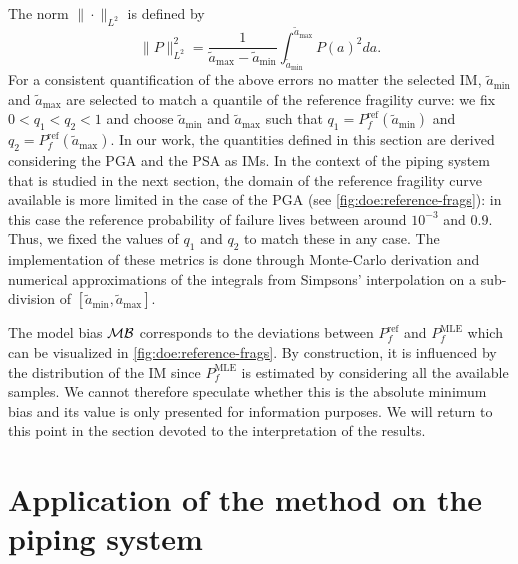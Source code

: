 The norm $\|\cdot\|_{L^2}$ is defined by 
    \begin{equation}
        \|P\|_{L^2}^2 = \frac{1}{\tilde a_{\max}-\tilde a_{\min}}\int_{\tilde a_{\min}}^{\tilde a_{\max}}P(a)^2da. 
    \end{equation}
For a consistent quantification of the above errors no matter the selected IM, $\tilde a_{\min}$ and $\tilde a_{\max}$ are selected to match a quantile of the reference fragility curve:
we fix $0<q_1<q_2<1$ and choose $\tilde a_{\min}$ and $\tilde a_{\max}$ such that $q_1=P^{\text{ref}}_f(\tilde a_{\min})$ and $q_2=P^{\text{ref}}_f(\tilde a_{\max})$. In our work, the quantities defined in this section are derived considering the PGA and the PSA as IMs.
In the context of the piping system that is studied in the next section, 
the domain of the reference fragility curve available is more limited in the case of the PGA (see \cref{fig:doe:reference-frags}): in this case the reference probability of failure lives between around $10^{-3} $ and $0.9$.
Thus, we fixed the values of $q_1$ and $q_2$ to match these in any case. The implementation of these metrics is done through Monte-Carlo derivation and numerical approximations of the integrals from Simpsons' interpolation on a sub-division of $[\tilde a_{\min},\tilde a_{\text{max}}]$.

{The model bias $\mathcal{M}\mathcal{B}$ corresponds to the deviations between $P_f^{\text{ref}}$ and $P_f^{\text{MLE}}$ which can be visualized in \cref{fig:doe:reference-frags}. By construction, it is influenced by the distribution of the IM since $P_f^{\text{MLE}}$ is estimated by considering all the available samples. We cannot therefore speculate whether this is the absolute minimum bias and its value is only presented for information purposes. We will return to this point in the section devoted to the interpretation of the results.}






\section{Application of the method on the piping system}\label{sec:doe:application}


